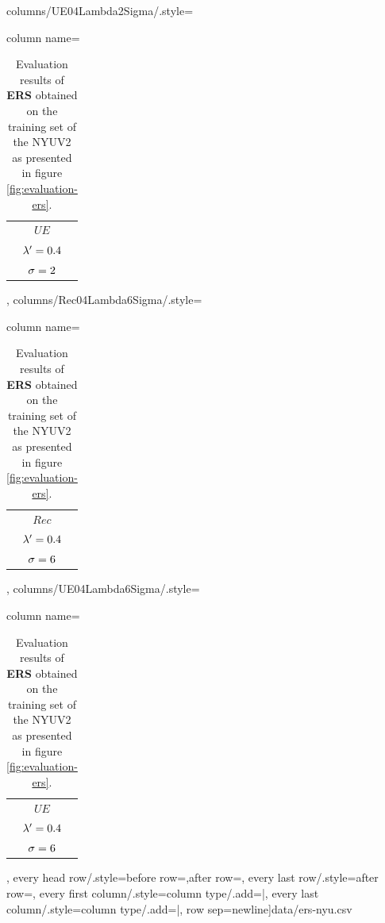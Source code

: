 \begin{table}[H]
		columns/UE04Lambda2Sigma/.style={column name=\begin{tabular}{c}$UE$\\$\lambda' = 0.4$\\$\sigma = 2$\end{tabular}},%
		columns/Rec04Lambda6Sigma/.style={column name=\begin{tabular}{c}$Rec$\\$\lambda' = 0.4$\\$\sigma = 6$\end{tabular}},%
		columns/UE04Lambda6Sigma/.style={column name=\begin{tabular}{c}$UE$\\$\lambda' = 0.4$\\$\sigma = 6$\end{tabular}},%
		every head row/.style={before row=\hline,after row=\hline\hline},%
		every last row/.style={after row=\hline},%
		every first column/.style={column type/.add={|}{}},%
		every last column/.style={column type/.add={}{|}},%
		row sep=newline]{data/ers-nyu.csv}
	\caption[Evaluation results of \textbf{ERS} \cite{LiuTuzelRamalingamChellappa:2011} obtained on the training set of the NYU Depth Dataset \cite{SilbermanHoiemKohliFergus:2012}.]{Evaluation results of \textbf{ERS} \cite{LiuTuzelRamalingamChellappa:2011} obtained on the training set of the NYUV2 as presented in figure \ref{fig:evaluation-ers}.}
\end{table}

